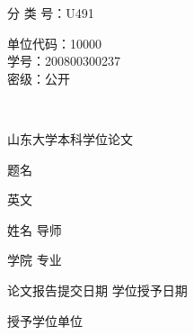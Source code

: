 \begin{titlepage}
\begin{center}
%
分 类 号：U491 \hfill
%
\newlength{\Mycode}
\settowidth{\Mycode}{学\qquad 号：200800300237}
\begin{minipage}[t]{\Mycode}
单位代码：10000\\
学\qquad 号：200800300237\\
密\qquad 级：公开
\end{minipage}
%
\linespread{2.2}\vspace{18mm}\\
\centerline{\Huge 山东大学本科学位论文}
%
\vspace{26mm}\heiti\large
\renewcommand{\ULthickness}{0.6pt}\setlength{\ULdepth}{4pt}
%
题\qquad 名 \uline{\hfill{}\hfill}\par
英\qquad 文 \uline{\hfill{}%
\hfill}\par
%
\vspace{20mm}
姓\qquad 名 \uline{\kaishu{}}\hfill
导\qquad 师 \uline{\kaishu{}}\par
学\qquad 院 \uline{\kaishu{}}\hfill
专\qquad 业 \uline{\kaishu{}}\par
%
\vspace{20mm}
论文报告提交日期 \uline{\kaishu{}}\hfill
学位授予日期 \uline{\kaishu\makebox[30mm]{~~~}}\par
授予学位单位 \uline{\hfill{}\hfill}\par




\end{center}
\end{titlepage}

